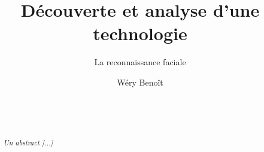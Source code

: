 \documentclass{sig-alternate-05-2015}
\begin{document}
\title{Découverte et analyse d'une technologie}
\subtitle{La reconnaissance faciale}
\author{
Wéry Benoît\\
       \affaddr{\today}\\
       \\
       \\
}
\maketitle

\begin{abstract}
\textcolor{dkblue}{\textit{Un abstract [...]}}
\end{abstract}










\end{document}
